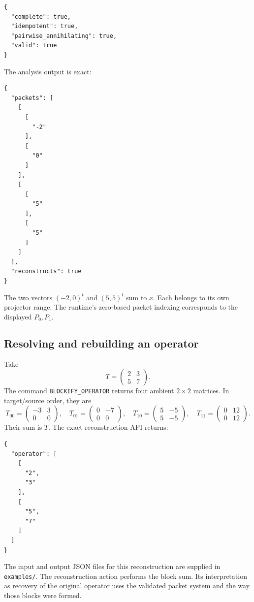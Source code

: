 \documentclass[a4paper,11pt]{article}
\begin{document}
\begin{lstlisting}
{
  "complete": true,
  "idempotent": true,
  "pairwise_annihilating": true,
  "valid": true
}
\end{lstlisting}
The analysis output is exact:

\begin{lstlisting}
{
  "packets": [
    [
      [
        "-2"
      ],
      [
        "0"
      ]
    ],
    [
      [
        "5"
      ],
      [
        "5"
      ]
    ]
  ],
  "reconstructs": true
}
\end{lstlisting}

The two vectors $(-2,0)^t$ and $(5,5)^t$ sum to $x$. Each belongs to its own projector range. The runtime's zero-based packet indexing corresponds to the displayed $P_0,P_1$.
\subsection{Resolving and rebuilding an operator}
Take
\[
T=\begin{pmatrix}2&3\\5&7\end{pmatrix}.
\]
The command \nolinkurl{BLOCKIFY_OPERATOR} returns four ambient $2\times2$ matrices. In target/source order, they are
\[
T_{00}=\begin{pmatrix}-3&3\\0&0\end{pmatrix},\quad
T_{01}=\begin{pmatrix}0&-7\\0&0\end{pmatrix},\quad
T_{10}=\begin{pmatrix}5&-5\\5&-5\end{pmatrix},\quad
T_{11}=\begin{pmatrix}0&12\\0&12\end{pmatrix}.
\]
Their sum is $T$. The exact reconstruction API returns:

\begin{lstlisting}
{
  "operator": [
    [
      "2",
      "3"
    ],
    [
      "5",
      "7"
    ]
  ]
}
\end{lstlisting}

The input and output JSON files for this reconstruction are supplied in \nolinkurl{examples/}. The reconstruction action performs the block sum. Its interpretation as recovery of the original operator uses the validated packet system and the way those blocks were formed.
\end{document}
